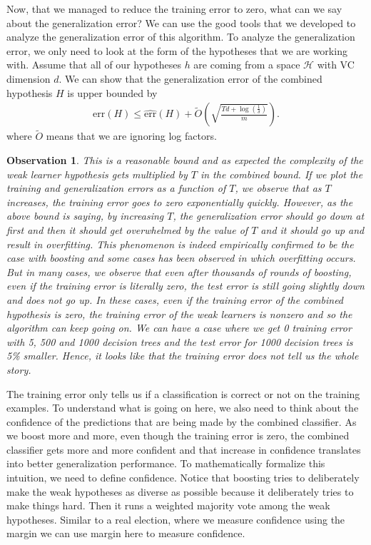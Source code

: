 \documentclass[10pt ]{article}
\newtheorem{obs}{Observation}
\begin{document}
Now, that we managed to reduce the training error to zero, what can we say about the generalization error? We can use the good tools that we developed to analyze the generalization error of this algorithm. To analyze the generalization error, we only need to look at the form of the hypotheses that we are working with. Assume that all of our hypotheses $h$ are coming from a space $\mathcal{H}$ with VC dimension $d$. We can show that the generalization error of the combined hypothesis $H$ is upper bounded by
\begin{align}
\mathrm{err}(H) \le \widehat{\mathrm{err}}(H) + \tilde{O} \left( \sqrt{\frac{Td+\log(\frac{1}{\delta})}{m}}\right).
\end{align}
where $\tilde{O}$ means that we are ignoring log factors. 
\begin{obs}{\em 
This is a reasonable bound and as expected the complexity of the weak learner hypothesis gets multiplied by $T$ in the combined bound. If we plot the training and generalization errors as a function of $T$, we observe that as $T$ increases, the training error goes to zero exponentially quickly. However, as the above bound is saying, by increasing $T$, the generalization error should go down at first and then it should get overwhelmed by the value of $T$ and it should go up and result in overfitting. This phenomenon is indeed empirically confirmed to be the case with boosting and some cases has been observed in which overfitting occurs. But in many cases, we observe that even after thousands of rounds of boosting, even if the training error is literally zero, the test error is still going slightly down and does not go up.  In these cases, even if the training error of the combined hypothesis is zero, the training error of the weak learners is nonzero and so the algorithm can keep going on.  We can have a case where we get 0 training error with 5, 500 and 1000 decision trees and the test error for 1000 decision trees is 5\% smaller. Hence, it looks like that the training error does not tell us the whole story. 
}\end{obs}
The training error only tells us if a classification is correct or not on the training examples. To understand what is going on here, we also need to think about the confidence of the predictions that are being made by the combined classifier. As we boost more and more, even though the training error is zero, the combined classifier gets more and more confident and that increase in confidence translates into better generalization performance. To mathematically formalize this intuition, we need to define confidence. Notice that boosting tries to deliberately make the weak hypotheses as diverse as possible because it deliberately tries to make things hard. Then it runs a weighted majority vote among the weak hypotheses. Similar to a real election, where we measure confidence using the margin we can use margin here to measure confidence. 
\end{document}
